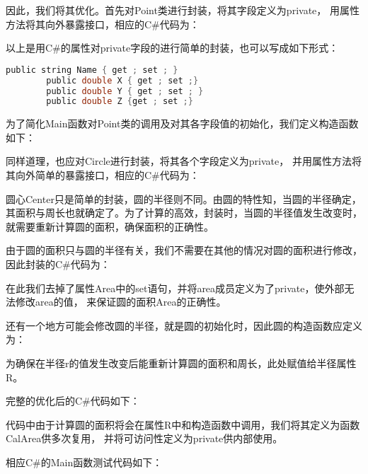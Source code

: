 因此，我们将其优化。首先对Point类进行封装，将其字段定义为private，
用属性方法将其向外暴露接口，相应的C\#代码为：



以上是用C\#的属性对private字段的进行简单的封装，也可以写成如下形式：
\begin{lstlisting}[language=C]
        public string Name { get ; set ; }
        public double X { get ; set ;}
        public double Y { get ; set ; }
        public double Z {get ; set ;}
\end{lstlisting}

为了简化Main函数对Point类的调用及对其各字段值的初始化，我们定义构造函数如下：


同样道理，也应对Circle进行封装，将其各个字段定义为private，
并用属性方法将其向外简单的暴露接口，相应的C\#代码为：



圆心Center只是简单的封装，圆的半径则不同。由圆的特性知，当圆的半径确定，
其面积与周长也就确定了。为了计算的高效，封装时，当圆的半径值发生改变时，
就需要重新计算圆的面积，确保面积的正确性。

由于圆的面积只与圆的半径有关，我们不需要在其他的情况对圆的面积进行修改，
因此封装的C\#代码为：



在此我们去掉了属性Area中的set语句，并将area成员定义为了private，使外部无法修改area的值，
来保证圆的面积Area的正确性。

还有一个地方可能会修改圆的半径，就是圆的初始化时，因此圆的构造函数应定义为：



为确保在半径r的值发生改变后能重新计算圆的面积和周长，此处赋值给半径属性R。

完整的优化后的C\#代码如下：


代码中由于计算圆的面积将会在属性R中和构造函数中调用，我们将其定义为函数CalArea供多次复用，
并将可访问性定义为private供内部使用。

相应C\#的Main函数测试代码如下：

